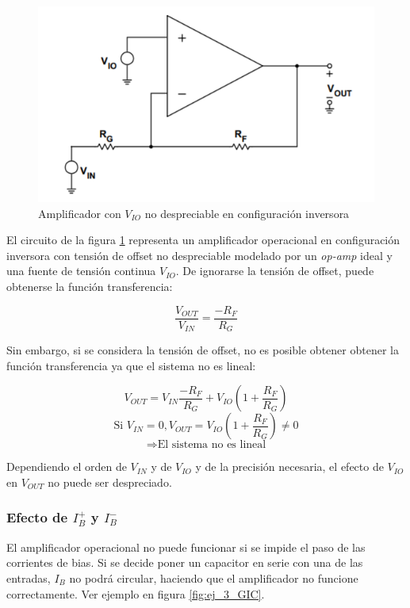 \documentclass[../../main.tex]{subfiles}
\begin{document}
\begin{figure}[htb]	%
	\centering
	\includegraphics[height=0.2\textheight]{imagenes/vio_amplificacion.png}
	\caption{Amplificador con $V_{IO}$ no despreciable en configuraci\'on inversora }
	\label{fig:ej_3_efecto_vio}
\end{figure}

El circuito de la figura \ref{fig:ej_3_efecto_vio} representa un amplificador operacional en configuraci\'on inversora con tensi\'on de offset no despreciable modelado por un \textit{op-amp} ideal y una fuente de tensi\'on continua $V_{IO}$. De ignorarse la tensi\'on de offset, puede obtenerse la funci\'on transferencia:

\[\frac{V_{OUT}}{V_{IN}}=\frac{-R_F}{R_G}\]

Sin embargo, si se considera la tensi\'on de offset, no es posible obtener obtener la funci\'on transferencia ya que el sistema no es lineal:

\[V_{OUT}=V_{IN}\frac{-R_F}{R_G} + V_{IO}\left(1+\frac{R_F}{R_G}\right)\]
\[\text{Si }V_{IN} = 0,V_{OUT} = V_{IO}\left(1+\frac{R_F}{R_G}\right) \neq 0 \]
\[\Rightarrow \text{El sistema no es lineal}\]

Dependiendo el orden de $V_{IN}$ y de $V_{IO}$ y de la precisi\'on necesaria, el efecto de $V_{IO}$ en $V_{OUT}$ no puede ser despreciado.

\subsubsection*{Efecto de $I_B^+$ y $I_B^-$}
El amplificador operacional no puede funcionar si se impide el paso de las corrientes de bias. Si se decide poner un capacitor en serie con una de las entradas, $I_B$ no podr\'a circular, haciendo que el amplificador no funcione correctamente. Ver ejemplo en figura \ref{fig:ej_3_GIC}.
\end{document}
